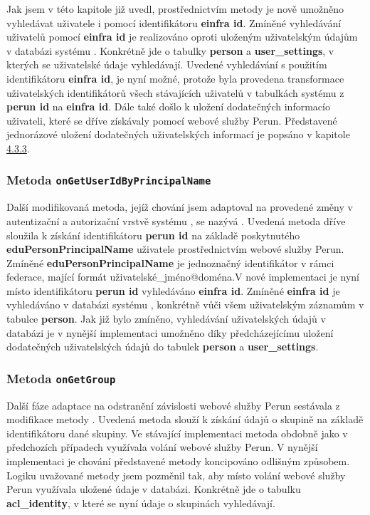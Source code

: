 \documentclass[
  printed, %
  twoside, %
  table,   %
  nolof,     %
  nolot,     %
]{fithesis3}
\begin{document}
Jak jsem v této kapitole již uvedl, prostřednictvím metody \linebreak {} je nově umožněno vyhledávat uživatele i pomocí identifikátoru \textbf{einfra id}. Zmíněné vyhledávání uživatelů pomocí \textbf{einfra id} je realizováno oproti uloženým uživatelským údajům v databázi systému . Konkrétně jde o tabulky \textbf{person} a \textbf{user\_settings}, v kterých se uživatelské údaje vyhledávají. Uvedené vyhledávání s použitím identifikátoru \textbf{einfra id}, je nyní možné, protože byla provedena transformace uživatelských identifikátorů všech stávajících uživatelů v tabulkách systému  z \textbf{perun id} na \textbf{einfra id}. Dále také došlo k uložení dodatečných informací\break o uživateli, které se dříve získávaly pomocí webové služby Perun. Představené jednorázové uložení dodatečných uživatelských informací je popsáno v kapitole \hyperref[zpracovaniAUlozeniPerun]{4.3.3}. 

\subsubsection{Metoda \texttt{onGetUserIdByPrincipalName}}

Další modifikovaná metoda, jejíž chování jsem adaptoval na provedené změny v autentizační a autorizační vrstvě systému , se nazývá . Uvedená metoda dříve sloužila k získání identifikátoru \textbf{perun id} na základě poskytnutého \textbf{eduPersonPrincipalName} uživatele prostřednictvím webové služby Perun. Zmíněné \textbf{eduPersonPrincipalName} je jednoznačný identifikátor v rámci federace, mající formát uživatelské\_jméno@doména.\break V nové implementaci je nyní místo identifikátoru \textbf{perun id} vyhledáváno \textbf{einfra id}. Zmíněné \textbf{einfra id} je vyhledáváno v databázi systému , konkrétně vůči všem uživatelským záznamům v tabulce \textbf{person}. Jak již bylo zmíněno, vyhledávání uživatelských údajů v databázi je v nynější implementaci umožněno díky předcházejícímu uložení dodatečných uživatelských údajů do tabulek \textbf{person} a \textbf{user\_settings}.

\subsubsection{Metoda \texttt{onGetGroup}}

Další fáze adaptace na odstranění závislosti webové služby Perun sestávala z modifikace metody . Uvedená metoda  slouží k získání údajů o skupině na základě identifikátoru dané skupiny. Ve stávající implementaci metoda obdobně jako v předchozích případech využívala volání webové služby Perun. V nynější implementaci je chování představené metody koncipováno odlišným způsobem. Logiku uvažované metody  jsem pozměnil tak, aby místo volání webové služby Perun využívala uložené údaje v databázi. Konkrétně jde o tabulku \textbf{acl\_identity}, v které se nyní údaje o skupinách vyhledávají. 
\end{document}
